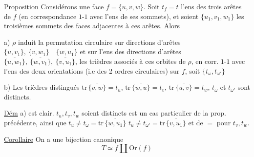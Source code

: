 \uline{Proposition} Considérons une face $f=\{u,v,w\}$.  Soit $t_f=t$ l'ens des trois arêtes de $f$ (en correspondance $1$-$1$ avec l'ens de ses sommets), et soient $\{u_1,v_1,w_1\}$ les troisièmes sommets des  faces  adjacentes à ces arêtes. Alors

a)  $\rho$ induit la permutation circulaire  sur   directions d'arêtes $\overline{\{u,v_1\}},\ \overline{\{v,w_1\}}\quad\overline{\{w,u_1\}}$ et sur l'ens des directions d'arêtes $\overline{\{u,w_1\}},\ \overline{\{w,v_1\}},\ \overline{\{v,u_1\}}$,
  les trièdres  associés à ces orbites de $\rho$, en corr. $1$-$1$ avec l'ens  des deux orientations (i.e des 2 ordres circulaires) sur $f$, soit $\{t_\omega,t_{\omega'}\}$

b) Les trièdres distingués $\mathrm{tr}\,\overline{\{v,w\}}=t_u$, $\mathrm{tr}\,\overline{\{w,u\}}=t_v$, $\mathrm{tr}\,\overline{\{u,v\}}=t_w$, $t_\omega$ et $t_{\omega'}$ sont distincts.

\uline{Dém} a) est clair.  $t_u,t_v,t_w$ soient distincts est un cas particulier de la prop. précédente, ainsi que $t_u\ne t_\omega=\mathrm{tr}\,\overline{\{w,u_1\}}$ $t_u\ne t_{\omega'}=\mathrm{tr}\,\overline{\{v,u_1\}}$ et de $=$ pour $t_v,t_w$.

\uline{Corollaire} On a une bijection canonique
\[
T\simeq f\amalg\mathrm{Or}(f)
\]
